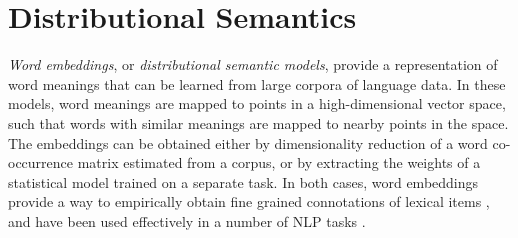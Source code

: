 \documentclass[9pt,twocolumn,twoside,lineno]{pnas-new}
\begin{document}
	\section{Distributional Semantics} \label{distmods}


	\emph{Word embeddings}, or \emph{distributional semantic models}, provide a representation of word meanings that can be learned from large corpora of language data. In these models, word meanings are mapped to points in a high-dimensional vector space, such that words with similar meanings are mapped to nearby points in the space. The embeddings can be obtained either by dimensionality reduction of a word co-occurrence matrix \cite{pennington2014glove} estimated from a corpus, or by extracting the weights of a statistical model \cite{mikolov2013distributed,peters2018deep,devlin2018bert} trained on a separate task. In both cases, word embeddings provide a way to empirically obtain fine grained connotations of lexical items \cite{mikolov2013distributed}, and have been used effectively in a number of NLP tasks \cite{dai2015semi,radford2018improving,socher2013recursive}. 


	
\end{document}
